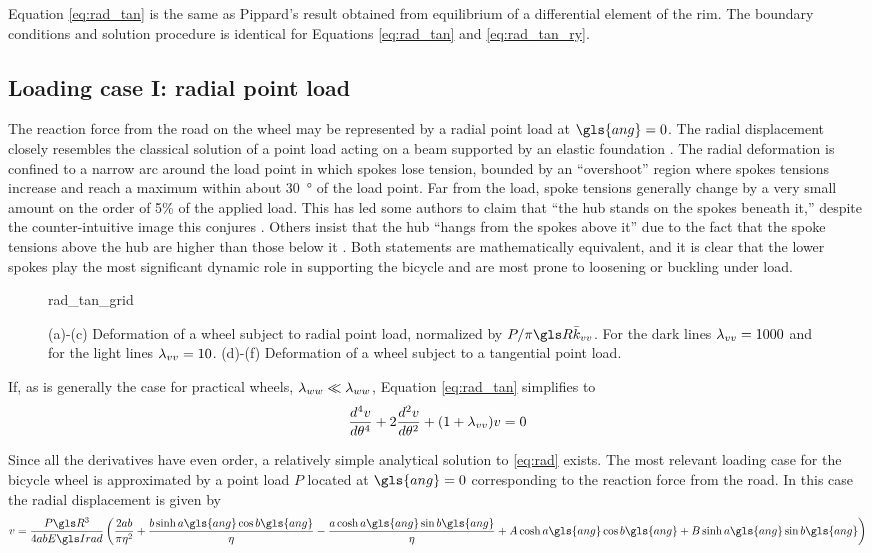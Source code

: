 \documentclass[\rootdir/thesis.tex]{subfiles}
\begin{document}
Equation \eqref{eq:rad_tan} is the same as Pippard’s result obtained from equilibrium of a differential element of the rim\cite{Pippard1932b}. The boundary conditions and solution procedure is identical for Equations \eqref{eq:rad_tan} and \eqref{eq:rad_tan_ry}.

\subsection{Loading case I: radial point load}

The reaction force from the road on the wheel may be represented by a radial point load at $\gls{ang}=0$. The radial displacement closely resembles the classical solution of a point load acting on a beam supported by an elastic foundation \cite{Hetenyi1946}. The radial deformation is confined to a narrow arc around the load point in which spokes lose tension, bounded by an ``overshoot'' region where spokes tensions increase and reach a maximum within about \SI{30}{\degree} of the load point. Far from the load, spoke tensions generally change by a very small amount on the order of 5\% of the applied load. This has led some authors to claim that ``the hub stands on the spokes beneath it,'' despite the counter-intuitive image this conjures \cite{Brandt1993,Forester1980}. Others insist that the hub ``hangs from the spokes above it'' due to the fact that the spoke tensions above the hub are higher than those below it \cite{Fine1998}. Both statements are mathematically equivalent, and it is clear that the lower spokes play the most significant dynamic role in supporting the bicycle and are most prone to loosening or buckling under load.

\begin{figure}
\centering
{rad_tan_grid}
\caption{(a)-(c) Deformation of a wheel subject to radial point load, normalized by $P/\pi\R\kvv$. For the dark lines $\lambda_{vv}=1000$ and for the light lines $\lambda_{vv}=10$. (d)-(f) Deformation of a wheel subject to a tangential point load.}
\label{fig:rad_tan_grid}
\end{figure}

If, as is generally the case for practical wheels, $\lambda_{ww} \ll \lambda_{ww}$, Equation \eqref{eq:rad_tan} simplifies to
\begin{equation}
\label{eq:rad}
\frac{d^4v}{d\theta^4} + 2\frac{d^2v}{d\theta^2} + (1+\lambda_{vv})v=0
\end{equation}

Since all the derivatives have even order, a relatively simple analytical solution to \eqref{eq:rad} exists. The most relevant loading case for the bicycle wheel is approximated by a point load $P$ located at $\gls{ang}=0$ corresponding to the reaction force from the road. In this case the radial displacement is given by
\begin{equation}
\label{eq:rad_soln}
v = \frac{P\R^3}{4ab\EIr} \left( \frac{2ab}{\pi\eta^2} + \frac{b\sinh{a\gls{ang}}\cos{b\gls{ang}}}{\eta} 
                               -\frac{a\cosh{a\gls{ang}}\sin{b\gls{ang}}}{\eta}
                               +A\cosh{a\gls{ang}}\cos{b\gls{ang}} + B\sinh{a\gls{ang}}\sin{b\gls{ang}}\right)
\end{equation}
\end{document}
